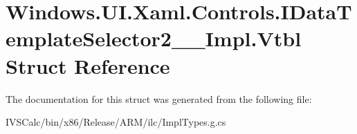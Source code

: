 \hypertarget{struct_windows_1_1_u_i_1_1_xaml_1_1_controls_1_1_i_data_template_selector2_____impl_1_1_vtbl}{}\section{Windows.\+U\+I.\+Xaml.\+Controls.\+I\+Data\+Template\+Selector2\+\_\+\+\_\+\+Impl.\+Vtbl Struct Reference}
\label{struct_windows_1_1_u_i_1_1_xaml_1_1_controls_1_1_i_data_template_selector2_____impl_1_1_vtbl}


The documentation for this struct was generated from the following file\+:\begin{DoxyCompactItemize}
\item 
I\+V\+S\+Calc/bin/x86/\+Release/\+A\+R\+M/ilc/Impl\+Types.\+g.\+cs\end{DoxyCompactItemize}
